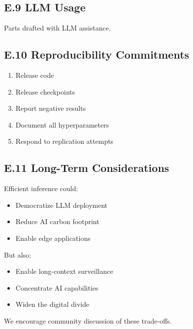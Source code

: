 \subsection{E.9 LLM Usage}

Parts drafted with LLM assistance.

\subsection{E.10 Reproducibility Commitments}

\begin{enumerate}
\item Release code
\item Release checkpoints
\item Report negative results
\item Document all hyperparameters
\item Respond to replication attempts

\end{enumerate}
\subsection{E.11 Long-Term Considerations}

Efficient inference could:

\begin{itemize}
\item Democratize LLM deployment
\item Reduce AI carbon footprint
\item Enable edge applications

\end{itemize}
But also:

\begin{itemize}
\item Enable long-context surveillance
\item Concentrate AI capabilities
\item Widen the digital divide

\end{itemize}
We encourage community discussion of these trade-offs.